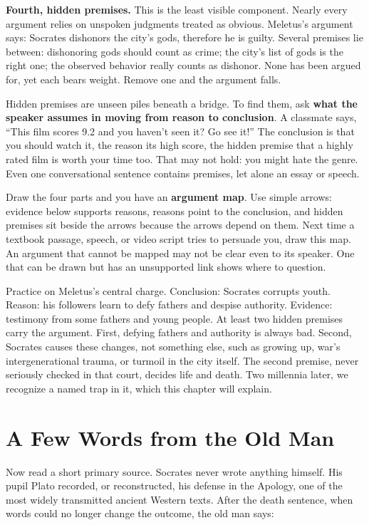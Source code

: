 \textbf{Fourth, hidden premises.} This is the least visible component. Nearly every argument relies on unspoken judgments treated as obvious. Meletus's argument says: Socrates dishonors the city's gods, therefore he is guilty. Several premises lie between: dishonoring gods should count as crime; the city's list of gods is the right one; the observed behavior really counts as dishonor. None has been argued for, yet each bears weight. Remove one and the argument falls.

Hidden premises are unseen piles beneath a bridge. To find them, ask \textbf{what the speaker assumes in moving from reason to conclusion}. A classmate says, ``This film scores 9.2 and you haven't seen it? Go see it!'' The conclusion is that you should watch it, the reason its high score, the hidden premise that a highly rated film is worth your time too. That may not hold: you might hate the genre. Even one conversational sentence contains premises, let alone an essay or speech.

Draw the four parts and you have an \textbf{argument map}. Use simple arrows: evidence below supports reasons, reasons point to the conclusion, and hidden premises sit beside the arrows because the arrows depend on them. Next time a textbook passage, speech, or video script tries to persuade you, draw this map. An argument that cannot be mapped may not be clear even to its speaker. One that can be drawn but has an unsupported link shows where to question.

Practice on Meletus's central charge. Conclusion: Socrates corrupts youth. Reason: his followers learn to defy fathers and despise authority. Evidence: testimony from some fathers and young people. At least two hidden premises carry the argument. First, defying fathers and authority is always bad. Second, Socrates causes these changes, not something else, such as growing up, war's intergenerational trauma, or turmoil in the city itself. The second premise, never seriously checked in that court, decides life and death. Two millennia later, we recognize a named trap in it, which this chapter will explain.

\section{A Few Words from the Old Man}
Now read a short primary source. Socrates never wrote anything himself. His pupil Plato recorded, or reconstructed, his defense in the Apology, one of the most widely transmitted ancient Western texts. After the death sentence, when words could no longer change the outcome, the old man says:

